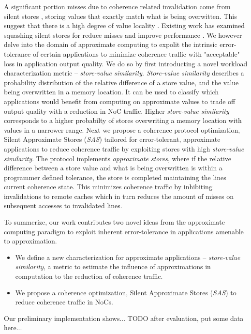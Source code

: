 A significant portion misses due to coherence related invalidation come from silent stores \cite{Lepak2002}, storing values that exactly match what is being overwitten. This suggest that there is a high degree of value locality \cite{Lipasti1996}. Existing work has examined squashing silent stores for reduce misses and improve performance \cite{Lepak2000, Lepak2002}. We however delve into the domain of approximate computing to expolit the intrinsic error-tolerance of certain applications to minimize coherence traffic with "acceptable" loss in application output quality. We do so by first introducting a novel workload characterization metric -- \textit{store-value similarity}. \textit{Store-value similarity} describes a probability distribution of the relative difference of a store value, and the value being overwritten in a memory location. It can be used to classify which applications would benefit from computing on approximate values to trade off output quality with a reduction in NoC traffic. Higher \textit{store-value similarity} corresponds to a higher probabilty of stores overwriting a memory location with values in a narrower range. Next we propose a coherence protocol optimization, Silent Approximate Stores (\textit{SAS}) tailored for error-tolerant, approximate applications to reduce coherence traffic by exploiting stores with high \textit{store-value similarity}. The protocol implements \textit{approximate stores}, where if the relative difference between a store value and what is being overwritten is within a programmer defined tolerance, the store is completed maintaining the lines current coherence state. This minimizes coherence traffic by inhibiting invalidations to remote caches which in turn reduces the amount of misses on subsequent accesses to invalidated lines.



To summerize, our work contributes two novel ideas from the approximate computing paradigm to exploit inherent error-tolerance in applications amenable to approximation.
\begin{itemize}
	\item We define a new characterization for approximate applications -- \textit{store-value similarity}, a metric to estimate the influence of approximations in computation to the reduction of coherence traffic.
	\item We propose a coherence optimization, Silent Approximate Stores (\textit{SAS}) to reduce coherence traffic in NoCs.	
\end{itemize}

Our preliminary implementation shows... TODO after evaluation, put some data here...